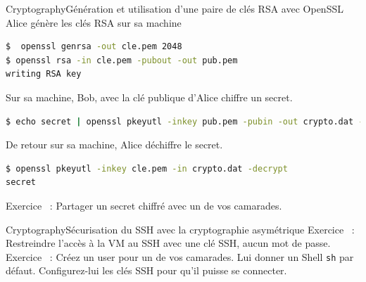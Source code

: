 \documentclass{beamer}
\begin{document}
    \begin{frame}[fragile]{Cryptography}{Génération et utilisation d'une paire de clés RSA avec OpenSSL}
        Alice génère les clés RSA sur sa machine
        \begin{lstlisting}[language=bash,basicstyle=\ttfamily\small]
$  openssl genrsa -out cle.pem 2048
$ openssl rsa -in cle.pem -pubout -out pub.pem
writing RSA key
        \end{lstlisting}
        Sur sa machine, Bob, avec la clé publique d'Alice chiffre un secret.
        \begin{lstlisting}[language=bash,basicstyle=\ttfamily\small]
$ echo secret | openssl pkeyutl -inkey pub.pem -pubin -out crypto.dat -encrypt
        \end{lstlisting}
        De retour sur sa machine, Alice déchiffre le secret.
        \begin{lstlisting}[language=bash,basicstyle=\ttfamily\small]
$ openssl pkeyutl -inkey cle.pem -in crypto.dat -decrypt
secret
        \end{lstlisting}
        Exercice \execcounterdispinc~:
        Partager un secret chiffré avec un de vos camarades.
    \end{frame}

    \begin{frame}{Cryptography}{Sécurisation du SSH avec la cryptographie asymétrique}
        Exercice \execcounterdispinc{}~:
        Restreindre l'accès à la VM au SSH avec une clé SSH, aucun mot de passe.
        \bigbreak
        Exercice \execcounterdispinc{}~:
        Créez un user pour un de vos camarades.
        Lui donner un Shell \lstinline{sh} par défaut.
        Configurez-lui les clés SSH pour qu'il puisse se connecter.
    \end{frame}
\end{document}
